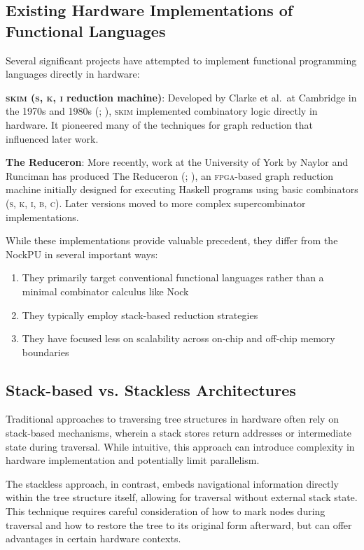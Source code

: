\documentclass[twoside]{article}
\begin{document}
\subsection{Existing Hardware Implementations of Functional Languages}

Several significant projects have attempted to implement functional programming languages directly in hardware:

\textbf{\textsc{skim} (\textsc{s}, \textsc{k}, \textsc{i} reduction machine)}: Developed by Clarke et al.\ at Cambridge in the 1970s and 1980s (\citet{Clarke1980}; \citet{Norman1984}), \textsc{skim} implemented combinatory logic directly in hardware. It pioneered many of the techniques for graph reduction that influenced later work.

\textbf{The Reduceron}: More recently, work at the University of York by Naylor and Runciman has produced The Reduceron (\citet{Naylor2008}; \citet{Naylor2009}), an \textsc{fpga}-based graph reduction machine initially designed for executing Haskell programs using basic combinators (\textsc{s}, \textsc{k}, \textsc{i}, \textsc{b}, \textsc{c}). Later versions moved to more complex supercombinator implementations.

While these implementations provide valuable precedent, they differ from the NockPU in several important ways:
\begin{enumerate}
  \item They primarily target conventional functional languages rather than a minimal combinator calculus like Nock
  \item They typically employ stack-based reduction strategies
  \item They have focused less on scalability across on-chip and off-chip memory boundaries
\end{enumerate}

\subsection{Stack-based vs. Stackless Architectures}

Traditional approaches to traversing tree structures in hardware often rely on stack-based mechanisms, wherein a stack stores return addresses or intermediate state during traversal. While intuitive, this approach can introduce complexity in hardware implementation and potentially limit parallelism.

The stackless approach, in contrast, embeds navigational information directly within the tree structure itself, allowing for traversal without external stack state. This technique requires careful consideration of how to mark nodes during traversal and how to restore the tree to its original form afterward, but can offer advantages in certain hardware contexts.
\end{document}
